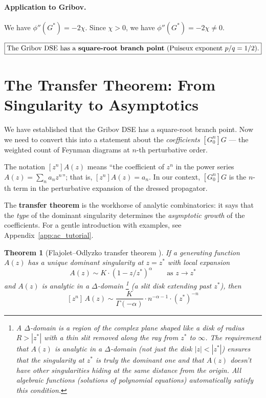 \documentclass[11pt,a4paper]{article}
\newtheorem{theorem}{Theorem}[section]
\theoremstyle{definition}
\begin{document}
\paragraph{Application to Gribov.}
We have $\phi''(G^*) = -2\chi$. Since $\chi > 0$, we have $\phi''(G^*) = -2\chi \neq 0$.

\begin{equation}
\boxed{\text{The Gribov DSE has a \textbf{square-root branch point} (Puiseux exponent } p/q = 1/2\text{).}}
\end{equation}

\section{The Transfer Theorem: From Singularity to Asymptotics}
\label{sec:transfer}

We have established that the Gribov DSE has a square-root branch point.
Now we need to convert this into a statement about the \emph{coefficients}
$[G_0^n]G$ --- the weighted count of Feynman diagrams at $n$-th
perturbative order.

The notation $[z^n]A(z)$ means ``the coefficient of $z^n$ in the power
series $A(z) = \sum_n a_n z^n$''; that is, $[z^n]A(z) = a_n$. In our
context, $[G_0^n]G$ is the $n$-th term in the perturbative expansion of
the dressed propagator.

The \textbf{transfer theorem} is the workhorse of analytic combinatorics:
it says that the \emph{type} of the dominant singularity determines the
\emph{asymptotic growth} of the coefficients. For a gentle introduction
with examples, see Appendix~\ref{app:ac_tutorial}.

\begin{theorem}[Flajolet--Odlyzko transfer theorem {\cite[Thm.~VI.3]{flajolet2009}}]
\label{thm:transfer}
If a generating function $A(z)$ has a unique dominant singularity at $z = z^*$
with local expansion
\begin{equation}
A(z) \sim K \cdot (1 - z/z^*)^\alpha \qquad \text{as } z \to z^*
\end{equation}
and $A(z)$ is analytic in a $\Delta$-domain%
\footnote{A $\Delta$-domain is a region of the complex plane shaped like a
disk of radius $R > |z^*|$ with a thin slit removed along the ray from
$z^*$ to $\infty$. The requirement that $A(z)$ is analytic in a
$\Delta$-domain (not just the disk $|z| < |z^*|$) ensures that the
singularity at $z^*$ is truly the \emph{dominant} one and that $A(z)$
doesn't have other singularities hiding at the same distance from the
origin. All algebraic functions (solutions of polynomial equations)
automatically satisfy this condition.}
(a slit disk extending past $z^*$), then
\begin{equation}
\boxed{[z^n]\, A(z) \sim \frac{K}{\Gamma(-\alpha)} \cdot n^{-\alpha - 1} \cdot (z^*)^{-n}}
\label{eq:transfer}
\end{equation}
\end{theorem}
\end{document}
